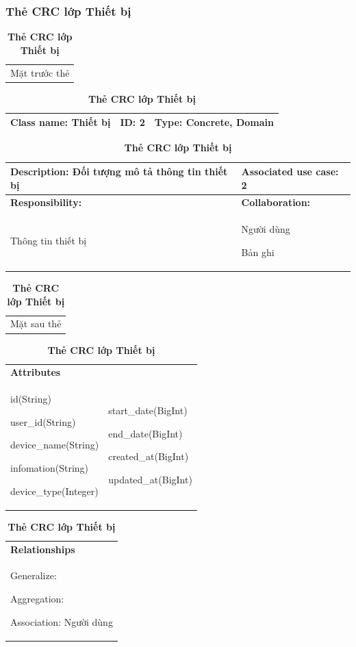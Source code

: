   \subsubsection{Thẻ CRC lớp Thiết bị}
  \begin{table}[H]
    \caption{\bfseries \fontsize{12pt}{0pt}\selectfont Thẻ CRC lớp Thiết bị}
    \centering
    \begin{tabularx}{0.9\textwidth}{X}
      Mặt trước thẻ
    \end{tabularx}
    \begin{tabularx}{0.9\textwidth}{|X|X|X|}
      \hline
      \textbf{Class name:} Thiết bị & \textbf{ID:} 2 & \textbf{Type:} Concrete, Domain \\
      \hline
    \end{tabularx}
    \begin{tabularx}{0.9\textwidth}{|X|X|}
      \textbf{Description:} Đối tượng mô tả thông tin thiết bị & \textbf{Associated use case:} 2 \\
      \hline
      \textbf{Responsibility:} & \textbf{Collaboration:} \\
      Thông tin thiết bị 
      & 
      Người dùng 

      Bản ghi
      \\
      \hline
    \end{tabularx}
    \begin{tabularx}{0.9\textwidth}{X}
      Mặt sau thẻ
    \end{tabularx}
    \begin{tabularx}{0.9\textwidth}{|X|X|}
      \hline
      \textbf{Attributes} & \\
      id(String) 
      
      user\_id(String)

      device\_name(String)

      infomation(String)

      device\_type(Integer)
      & 
      start\_date(BigInt) 
      
      end\_date(BigInt) 
      
      created\_at(BigInt)

      updated\_at(BigInt)
      \\
      \hline
    \end{tabularx}
    \begin{tabularx}{0.9\textwidth}{|X|}
      \textbf{Relationships} \\
      Generalize:  

      Aggregation:  
      
      Association: Người dùng 
      \\
      \hline
    \end{tabularx}
  \end{table}

